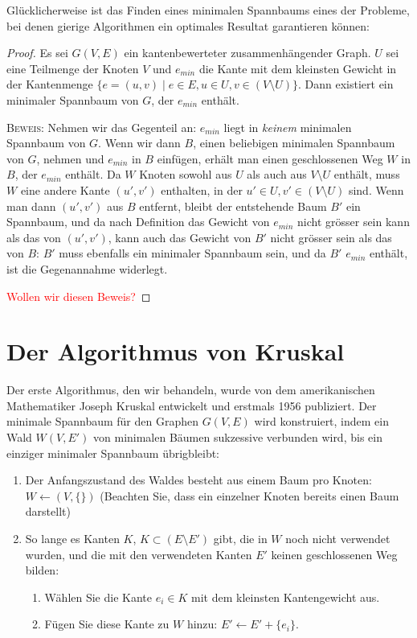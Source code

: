 \documentclass[12pt,a4paper]{report}
\theoremstyle{break}
\theoremstyle{plain}
\newtheorem{proof}{Satz}[section]
\begin{document}
Gl\"{u}cklicherweise ist das Finden eines minimalen Spannbaums eines
der Probleme, bei denen gierige Algorithmen ein optimales Resultat
garantieren k\"{o}nnen:

\begin{proof}\label{minimalkante}
  Es sei $G(V,E)$ ein kantenbewerteter
  zusammenh\"{a}ngender Graph. $U$ sei eine Teilmenge der Knoten $V$ und
  $e_{min}$ die Kante mit dem kleinsten Gewicht in der Kantenmenge
  $\{e=(u,v) \mid e\in E, u\in U, v\in (V\!\setminus\!U) \}$. Dann existiert ein
  minimaler Spannbaum von $G$, der $e_{min}$ enth\"{a}lt.

 \bigskip\noindent\textsc{Beweis:} Nehmen wir das Gegenteil an: $e_{min}$
liegt in \emph{keinem} minimalen Spannbaum von $G$. Wenn wir dann $B$,
einen beliebigen minimalen Spannbaum von $G$, nehmen und $e_{min}$ in $B$
einf\"{u}gen, erh\"{a}lt man einen geschlossenen Weg $W$ in $B$, der
$e_{min}$ enth\"{a}lt. Da $W$ Knoten sowohl aus $U$ als auch aus
$V\!\setminus\!U$ enth\"{a}lt, muss $W$ eine andere Kante $(u', v')$
enthalten, in der $u' \in U, v'\in (V\!\setminus\!U)$ sind. Wenn man
dann $(u',v')$ aus $B$ entfernt, bleibt der entstehende Baum $B'$ ein Spannbaum, und da nach
Definition das Gewicht von $e_{min}$ nicht gr\"{o}sser sein kann als
das von $(u',v')$, kann auch das Gewicht von $B'$ nicht
gr\"{o}sser sein als das von $B$: $B'$ muss ebenfalls ein minimaler
Spannbaum sein, und da $B'$ $e_{min}$ enth\"{a}lt, ist die
Gegenannahme widerlegt.

\textcolor{red}{Wollen wir diesen Beweis?}
\end{proof} 

\section{Der Algorithmus von Kruskal}

Der erste Algorithmus, den wir behandeln, wurde von dem
amerikanischen Mathematiker Joseph Kruskal entwickelt und erstmals
1956 publiziert. Der minimale Spannbaum f\"{u}r den Graphen $G(V,E)$
wird konstruiert, indem ein Wald $W(V, E')$ von minimalen B\"{a}umen
sukzessive verbunden wird, bis ein einziger minimaler Spannbaum
\"ubrigbleibt:

\begin{enumerate}
\item Der Anfangszustand des Waldes besteht aus einem Baum pro Knoten:
  $W \gets (V, \{\})$ (Beachten Sie, dass ein
  einzelner Knoten bereits einen Baum darstellt)
\item So lange es Kanten $K$, $K\subset (E\setminus{E'})$ gibt, die in $W$ noch nicht
  verwendet wurden, und die mit den verwendeten Kanten $E'$ keinen
  geschlossenen Weg bilden:
\begin{enumerate}
\item W\"{a}hlen Sie die Kante $e_i\in K$ mit dem kleinsten
  Kantengewicht aus.
\item F\"{u}gen Sie diese Kante zu $W$ hinzu: $E' \gets E'+\{e_i\}$.
\end{enumerate}
\end{enumerate}
\end{document}
